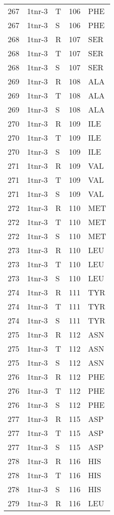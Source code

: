 \begin{longtable}[l]{l|l|l|l|l}
	267 & 1tnr-3 & T & 106 & PHE \\
	267 & 1tnr-3 & S & 106 & PHE \\
	268 & 1tnr-3 & R & 107 & SER \\
	268 & 1tnr-3 & T & 107 & SER \\
	268 & 1tnr-3 & S & 107 & SER \\
	269 & 1tnr-3 & R & 108 & ALA \\
	269 & 1tnr-3 & T & 108 & ALA \\
	269 & 1tnr-3 & S & 108 & ALA \\
	270 & 1tnr-3 & R & 109 & ILE \\
	270 & 1tnr-3 & T & 109 & ILE \\
	270 & 1tnr-3 & S & 109 & ILE \\
	271 & 1tnr-3 & R & 109 & VAL \\
	271 & 1tnr-3 & T & 109 & VAL \\
	271 & 1tnr-3 & S & 109 & VAL \\
	272 & 1tnr-3 & R & 110 & MET \\
	272 & 1tnr-3 & T & 110 & MET \\
	272 & 1tnr-3 & S & 110 & MET \\
	273 & 1tnr-3 & R & 110 & LEU \\
	273 & 1tnr-3 & T & 110 & LEU \\
	273 & 1tnr-3 & S & 110 & LEU \\
	274 & 1tnr-3 & R & 111 & TYR \\
	274 & 1tnr-3 & T & 111 & TYR \\
	274 & 1tnr-3 & S & 111 & TYR \\
	275 & 1tnr-3 & R & 112 & ASN \\
	275 & 1tnr-3 & T & 112 & ASN \\
	275 & 1tnr-3 & S & 112 & ASN \\
	276 & 1tnr-3 & R & 112 & PHE \\
	276 & 1tnr-3 & T & 112 & PHE \\
	276 & 1tnr-3 & S & 112 & PHE \\
	277 & 1tnr-3 & R & 115 & ASP \\
	277 & 1tnr-3 & T & 115 & ASP \\
	277 & 1tnr-3 & S & 115 & ASP \\
	278 & 1tnr-3 & R & 116 & HIS \\
	278 & 1tnr-3 & T & 116 & HIS \\
	278 & 1tnr-3 & S & 116 & HIS \\
	279 & 1tnr-3 & R & 116 & LEU \\

\end{longtable}
